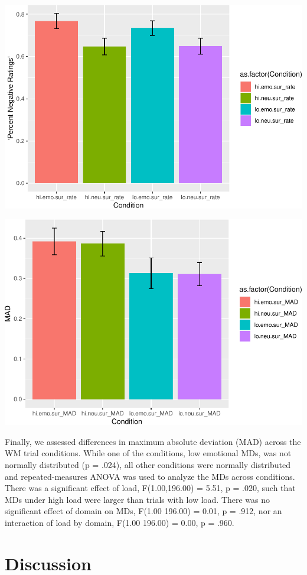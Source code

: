\documentclass[man]{apa6}
\begin{document}
\includegraphics{Manuscript_files/figure-latex/plot figure 1-1.pdf}

\includegraphics{Manuscript_files/figure-latex/MAD plot-1.pdf}

Finally, we assessed differences in maximum absolute deviation (MAD) across the WM trial conditions. While one of the conditions, low emotional MDs, was not normally distributed (p = .024), all other conditions were normally distributed and repeated-measures ANOVA was used to analyze the MDs across conditions. There was a significant effect of load, F(1.00,196.00) = 5.51, p = .020, such that MDs under high load were larger than trials with low load. There was no significant effect of domain on MDs, F(1.00 196.00) = 0.01, p = .912, nor an interaction of load by domain, F(1.00 196.00) = 0.00, p = .960.

\hypertarget{discussion}{%
\section{Discussion}\label{discussion}}
\end{document}
